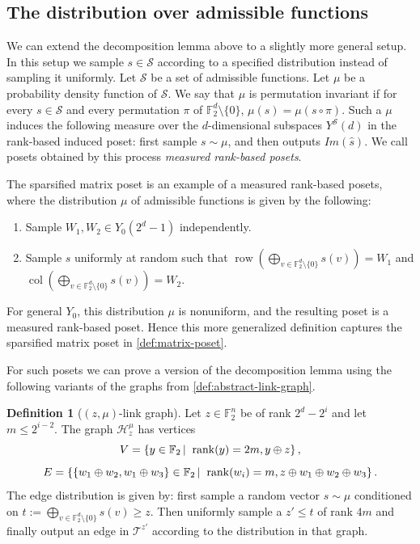 \documentclass[10pt,a4paper]{article}
\newcommand{\prettyref}[1]{\cref{#1}}
\theoremstyle{definition}
\newtheorem{definition}[theorem]{Definition}
\theoremstyle{remark}
\newcommand\sett[2]{\left\{ #1 \left| \; \vphantom{#1 #2} \right. #2  \right\}}
\newcommand{\set}[1]{\{#1\}}
\newcommand{\F}{\mathbb{F}}
\DeclareMathOperator{\rank}{rank}
\DeclareMathOperator{\row}{row}
\DeclareMathOperator{\col}{col}
\renewcommand{\leq}{\leqslant}
\renewcommand{\geq}{\geqslant}
\numberwithin{equation}{section}
\let\pref=\prettyref
\def\Y{Y}
\begin{document}
\subsection{The distribution over admissible functions} \label{sec:distribution-over-admissibles}
We can extend the decomposition lemma above to a slightly more general setup. In this setup we sample \(s \in \mathcal{S}\) according to a specified distribution instead of sampling it uniformly. Let \(\mathcal{S}\) be a set of admissible functions. Let \(\mu\) be a probability density function of \(\mathcal{S}\). We say that \(\mu\) is permutation invariant if for every \(s \in \mathcal{S}\) and every permutation \(\pi\) of \(\F_2^d \setminus \set{0}\),  \(\mu(s)=\mu(s \circ \pi)\). Such a $\mu$ induces the following measure over the $d$-dimensional subspaces \(\Y^{\mathcal{S}}(d)\) in the rank-based induced poset: first sample \(s \sim \mu\), and then outputs \(Im(\widehat{s})\). We call posets obtained by this process \emph{measured rank-based posets}.

The sparsified matrix poset is an example of a measured rank-based posets, where the distribution \(\mu\) of admissible functions is given by the following: \begin{enumerate}
    \item Sample \(W_1, W_2 \in \Y_0(2^d -1)\) independently.
    \item Sample \(s\) uniformly at random such that \(\row(\bigoplus_{v \in \F_2^d \setminus \set{0}} s(v)) = W_1\) and \(\col(\bigoplus_{v \in \F_2^d \setminus \set{0}} s(v)) = W_2\).
\end{enumerate} 
For general $Y_0$, this distribution $\mu$ is nonuniform, and the resulting poset is a measured rank-based poset.
Hence this more generalized definition captures the sparsified matrix poset in \pref{def:matrix-poset}.

For such posets we can prove a version of the decomposition lemma using the following variants of the graphs from \pref{def:abstract-link-graph}.
\begin{definition}[\((z,\mu)\)-link graph]
    Let \(z \in \F_2^n\) be of rank \(2^d-2^{i}\) and let \(m \leq 2^{i-2}\). The graph \(\mathcal{H}^\mu_{z}\) has vertices
    \[V = \sett{y \in \F_2}{\rank(y)=2m, y \oplus z},\]
    \[E = \sett{\set{w_1 \oplus w_2, w_1 \oplus w_3} \in \F_2}{\rank(w_i)=m, z \oplus w_1 \oplus w_2 \oplus w_3}.\]
    The edge distribution is given by: first sample a random vector \(s \sim \mu\) conditioned on \(t:=\bigoplus_{v \in \F_2^d \setminus \set{0}}s(v) \geq z\). Then uniformly sample a \(z' \leq t\) of rank $4m$ and finally output an edge in \(\mathcal{T}^{z'}\) according to the distribution in that graph.
\end{definition}
\end{document}
